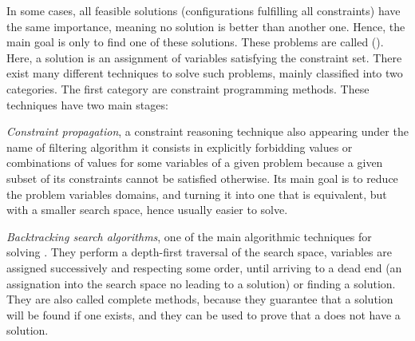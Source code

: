 In some cases, all feasible solutions (\ie configurations fulfilling all constraints) have the same importance, meaning no solution is better than another one. Hence, the main goal is only to find  one of these solutions. These problems are called {\it \CSPs{}} (\csp). Here, a solution is an assignment of variables satisfying the constraint set. There exist many different techniques to solve such problems, mainly classified into two categories. The first category are constraint programming methods. These techniques have two main stages:
\begin{inparaenum}[1)] \item \textit{Constraint propagation}, a constraint reasoning technique also appearing under the name of filtering algorithm it consists in explicitly forbidding values or combinations of values for some variables of a given problem because a given subset of its constraints cannot be satisfied otherwise. Its main goal is to reduce the problem variables domains, and turning it into one that is equivalent, but with a smaller search space, hence usually easier to solve. 
\item \textit{Backtracking search algorithms}, one of the main algorithmic techniques for solving \csps{}. They perform a depth-first traversal of the search space, \ie variables are assigned successively and respecting some order, until arriving to a dead end (an assignation into the search space no leading to a solution) or finding a solution. They are also called complete methods, because they guarantee that a solution will be found if one exists, and they can be used to prove that a \csp{} does not have a solution.
\end{inparaenum} 

